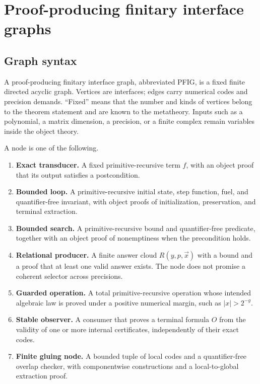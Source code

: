 \section{Proof-producing finitary interface graphs}
\label{sec:pfig}

\subsection{Graph syntax}

A proof-producing finitary interface graph, abbreviated PFIG, is a fixed finite directed acyclic graph.  Vertices are interfaces; edges carry numerical codes and precision demands.  ``Fixed'' means that the number and kinds of vertices belong to the theorem statement and are known to the metatheory.  Inputs such as a polynomial, a matrix dimension, a precision, or a finite complex remain variables inside the object theory.

\begin{definition}
A node is one of the following.

\begin{enumerate}
\item \textbf{Exact transducer.}  A fixed primitive-recursive term \(f\), with an object proof that its output satisfies a postcondition.
\item \textbf{Bounded loop.}  A primitive-recursive initial state, step function, fuel, and quantifier-free invariant, with object proofs of initialization, preservation, and terminal extraction.
\item \textbf{Bounded search.}  A primitive-recursive bound and quantifier-free predicate, together with an object proof of nonemptiness when the precondition holds.
\item \textbf{Relational producer.}  A finite answer cloud \(R(y,p,\vec{x})\) with a bound and a proof that at least one valid answer exists.  The node does not promise a coherent selector across precisions.
\item \textbf{Guarded operation.}  A total primitive-recursive operation whose intended algebraic law is proved under a positive numerical margin, such as \(|x|>2^{-g}\).
\item \textbf{Stable observer.}  A consumer that proves a terminal formula \(O\) from the validity of one or more internal certificates, independently of their exact codes.
\item \textbf{Finite gluing node.}  A bounded tuple of local codes and a quantifier-free overlap checker, with componentwise constructions and a local-to-global extraction proof.
\end{enumerate}
\end{definition}

